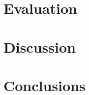 \documentclass{acm_proc_article-sp}
\begin{document}
\section{Evaluation}

\section{Discussion}

\section{Conclusions}



{}  %
\nocite{*}
%
%

\balancecolumns
\end{document}
